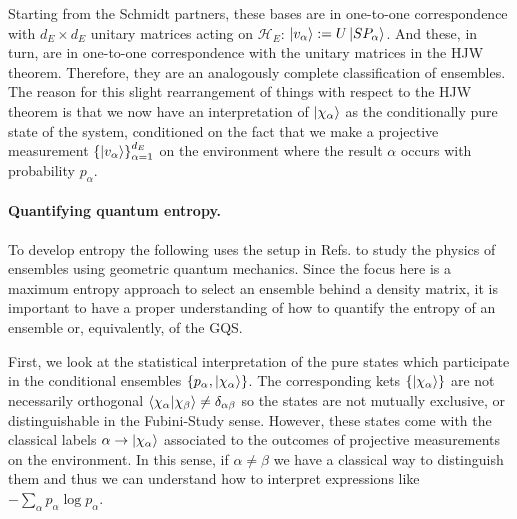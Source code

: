 \documentclass[draft,nofootinbib,pre,twocolumn,showpacs,showkeys,groupaddress,preprintnumbers,floatfix]{revtex4-1}
\newcommand{\1}{\mathbbm{1}}
\begin{document}
Starting from the Schmidt partners, these bases are in one-to-one
correspondence with $d_E \times d_E$ unitary matrices acting on
$\mathcal{H}_E$: $\ket{v_\alpha} : = U\ket{SP_\alpha}$. And these, in turn, are
in one-to-one correspondence with the unitary matrices in the HJW theorem.
Therefore, they are an analogously complete classification of ensembles. The
reason for this slight rearrangement of things with respect to the HJW theorem
is that we now have an interpretation of $\ket{\chi_\alpha}$ as the
conditionally pure state of the system, conditioned on the fact that we make a
projective measurement $\left\{ \ket{v_\alpha}\right\}_{\alpha=1}^{d_E}$ on the
environment where the result $\alpha$ occurs with probability $p_\alpha$.



\paragraph*{Quantifying quantum entropy.}
To develop entropy the following uses the setup in Refs.
\cite{Anza20a,Anza22,Anza22a} to study the physics of ensembles using geometric
quantum mechanics. Since the focus here is a maximum entropy approach to select
an ensemble behind a density matrix, it is important to have a proper
understanding of how to quantify the entropy of an ensemble or, equivalently,
of the GQS. 

First, we look at the statistical interpretation of the pure states which participate in  
the conditional ensembles $\left\{ p_\alpha,\ket{\chi_\alpha}\right\}$. The corresponding 
kets $\left\{ \ket{\chi_\alpha}\right\}$ are not necessarily orthogonal $\braket{\chi_\alpha}{\chi_\beta} \neq \delta_{\alpha \beta}$ 
so the states are not mutually exclusive, or distinguishable in the Fubini-Study sense. 
However, these states come with the classical labels $\alpha \to \ket{\chi_\alpha}$ associated 
to the outcomes of projective measurements on the environment. In this sense, if 
$\alpha \neq \beta$ we have a classical way to distinguish them and thus we can
understand how to interpret expressions like $-\sum_\alpha p_\alpha \log p_\alpha$.
\end{document}
